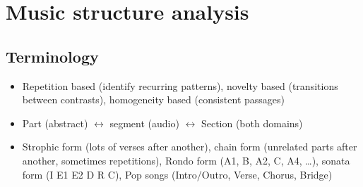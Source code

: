 \section{Music structure analysis}
\subsection{Terminology}
\begin{itemize}
	\item Repetition based (identify recurring patterns), novelty based (transitions between contrasts), homogeneity based (consistent passages)
	\item Part (abstract) $\leftrightarrow$ segment (audio) $\leftrightarrow$
		Section (both domains)
	\item
		Strophic form (lots of verses after another), chain form (unrelated parts after another, sometimes repetitions), Rondo form (A1, B, A2, C, A4, \dots), sonata form (I E1 E2 D R C), Pop songs (Intro/Outro, Verse, Chorus, Bridge)
\end{itemize}

